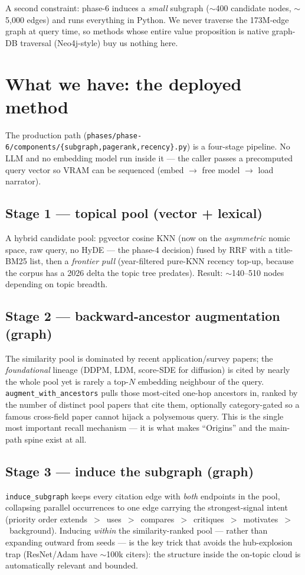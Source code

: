 \documentclass[11pt]{article}
\newcommand{\code}[1]{\texttt{\small #1}}
\begin{document}
A second constraint: phase-6 induces a \emph{small} subgraph ($\sim$400 candidate nodes,
$\sim$5{,}000 edges) and runs everything in Python. We never traverse the 173M-edge graph at query
time, so methods whose entire value proposition is native graph-DB traversal (Neo4j-style) buy us
nothing here.

\section{What we have: the deployed method}

The production path (\code{phases/phase-6/components/\{subgraph,pagerank,recency\}.py}) is a
four-stage pipeline. No LLM and no embedding model run inside it --- the caller passes a precomputed
query vector so VRAM can be sequenced (embed $\rightarrow$ free model $\rightarrow$ load narrator).

\subsection*{Stage 1 --- topical pool (vector + lexical)}
A hybrid candidate pool: pgvector cosine KNN (now on the \emph{asymmetric} nomic space, raw query,
no HyDE --- the phase-4 decision) fused by RRF with a title-BM25 list, then a \emph{frontier pull}
(year-filtered pure-KNN recency top-up, because the corpus has a 2026 delta the topic tree predates).
Result: $\sim$140--510 nodes depending on topic breadth.

\subsection*{Stage 2 --- backward-ancestor augmentation (graph)}
The similarity pool is dominated by recent application/survey papers; the \emph{foundational}
lineage (DDPM, LDM, score-SDE for diffusion) is cited by nearly the whole pool yet is rarely a
top-$N$ embedding neighbour of the query. \code{augment\_with\_ancestors} pulls those most-cited
one-hop ancestors in, ranked by the number of distinct pool papers that cite them, optionally
category-gated so a famous cross-field paper cannot hijack a polysemous query. This is the single
most important recall mechanism --- it is what makes ``Origins'' and the main-path spine exist at all.

\subsection*{Stage 3 --- induce the subgraph (graph)}
\code{induce\_subgraph} keeps every citation edge with \emph{both} endpoints in the pool, collapsing
parallel occurrences to one edge carrying the strongest-signal intent (priority order
extends~$>$~uses~$>$~compares~$>$~critiques~$>$~motivates~$>$~background). Inducing \emph{within} the
similarity-ranked pool --- rather than expanding outward from seeds --- is the key trick that avoids
the hub-explosion trap (ResNet/Adam have $\sim$100k citers): the structure inside the on-topic cloud
is automatically relevant and bounded.
\end{document}
